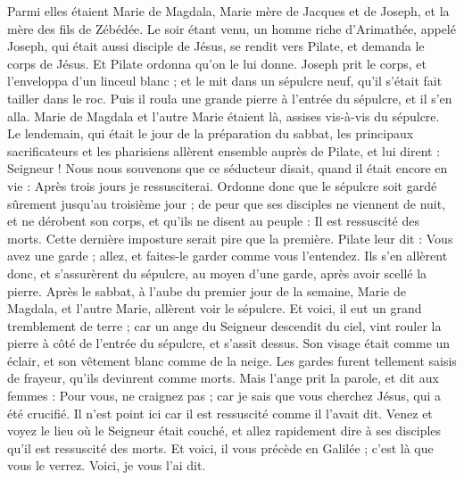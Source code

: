 \begin{multicols}{2}
Parmi elles étaient Marie de Magdala, Marie mère de Jacques et de Joseph, et la mère des fils de Zébédée.
Le soir étant venu, un homme riche d'Arimathée, appelé Joseph, qui était aussi disciple de Jésus,
se rendit vers Pilate, et demanda le corps de Jésus. Et Pilate ordonna qu’on le lui donne.
Joseph prit le corps, et l'enveloppa d'un linceul blanc ;
et le mit dans un sépulcre neuf, qu'il s’était fait tailler dans le roc. Puis il roula une grande pierre à l'entrée du sépulcre, et il s'en alla.
Marie de Magdala et l’autre Marie étaient là, assises vis-à-vis du sépulcre.
Le lendemain, qui était le jour de la préparation du sabbat, les principaux sacrificateurs et les pharisiens allèrent ensemble auprès de Pilate,
et lui dirent : Seigneur ! Nous nous souvenons que ce séducteur disait, quand il était encore en vie : Après trois jours je ressusciterai.
Ordonne donc que le sépulcre soit gardé sûrement jusqu’au troisième jour ; de peur que ses disciples ne viennent de nuit, et ne dérobent son corps, et qu'ils ne disent au peuple : Il est ressuscité des morts. Cette dernière imposture serait pire que la première.
Pilate leur dit : Vous avez une garde ; allez, et faites-le garder comme vous l’entendez.
Ils s'en allèrent donc, et s’assurèrent du sépulcre, au moyen d’une garde, après avoir scellé la pierre.
\VerseOne{}Après le sabbat, à l’aube du premier jour de la semaine, Marie de Magdala, et l'autre Marie, allèrent voir le sépulcre.
Et voici, il eut un grand tremblement de terre ; car un ange du Seigneur descendit du ciel, vint rouler la pierre à côté de l'entrée du sépulcre, et s'assit dessus.
Son visage était comme un éclair, et son vêtement blanc comme de la neige.
Les gardes furent tellement saisis de frayeur, qu'ils devinrent comme morts.
Mais l'ange prit la parole, et dit aux femmes : Pour vous, ne craignez pas ; car je sais que vous cherchez Jésus, qui a été crucifié.
Il n'est point ici car il est ressuscité comme il l'avait dit. Venez et voyez le lieu où le Seigneur était couché,
et allez rapidement dire à ses disciples qu'il est ressuscité des morts. Et voici, il vous précède en Galilée ; c’est là que vous le verrez. Voici, je vous l’ai dit.

\end{multicols}
